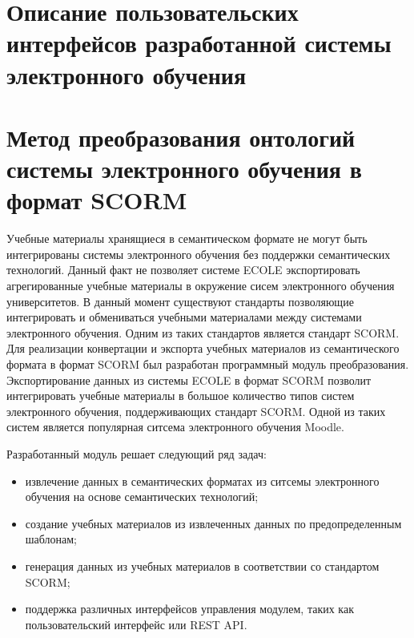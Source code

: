 \section{Описание пользовательских интерфейсов разработанной системы электронного обучения} \label{sect4_2}


















\section{Метод преобразования онтологий системы электронного обучения в формат SCORM} \label{sect4_3}

Учебные материалы хранящиеся в семантическом формате не могут быть интегрированы системы электронного обучения без поддержки семантических технологий. Данный факт не позволяет системе ECOLE экспортировать агрегированные учебные материалы в окружение сисем электронного обучения университетов. В данный момент существуют стандарты позволяющие интегрировать и обмениваться учебными материалами между системами электронного обучения. Одним из таких стандартов является стандарт SCORM. Для реализации конвертации и экспорта учебных материалов из семантического формата в формат SCORM был разработан программный модуль преобразования. Экспортирование данных из системы ECOLE в формат SCORM позволит интегрировать учебные материалы в большое количество типов систем электронного обучения, поддерживающих стандарт SCORM. Одной из таких систем является популярная ситсема электронного обучения Moodle.

Разработанный модуль решает следующий ряд задач:

\begin{itemize}
\item извлечение данных в семантических форматах из ситсемы электронного обучения на основе семантических технологий;
\item создание учебных материалов из извлеченных данных по предопределенным шаблонам;
\item генерация данных из учебных материалов в соответствии со стандартом SCORM;
\item поддержка различных интерфейсов управления модулем, таких как  пользовательский интерфейс или REST API.
\end{itemize}

